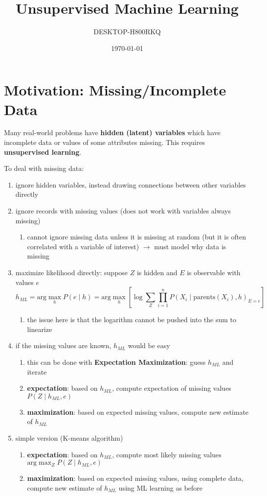 \documentclass[11pt]{article}
\author{DESKTOP-H800RKQ}
\date{\today}
\title{Unsupervised Machine Learning}
\begin{document}
\maketitle
\tableofcontents

\section{Motivation: Missing/Incomplete Data}
\label{sec:org3d6e7e9}
Many real-world problems have \textbf{hidden (latent) variables} which have incomplete data
or values of some attributes missing.
This requires \textbf{unsupervised learning}.

To deal with missing data:
\begin{enumerate}
\item ignore hidden variables, instead drawing connections between other variables directly
\item ignore records with missing values (does not work with variables always missing)
\begin{enumerate}
\item cannot ignore missing data unless it is missing at random (but it is often correlated
with a variable of interest) \(\to\) must model why data is missing
\end{enumerate}
\item maximize likelihood directly: suppose \(Z\) is hidden and \(E\) is observable with values \(e\)
$$ h_{ML} = \text{arg} \max_{h} P(e \mid h) = \text{arg} \max_{h} \left[ \log \sum_{Z} \prod_{i=1}^{n} P(X_{i} \mid \text{parents}(X_{i}), h)_{E = e} \right] $$
\begin{enumerate}
\item the issue here is that the logarithm cannot be pushed into the sum to linearize
\end{enumerate}
\item if the missing values are known, \(h_{ML}\) would be easy
\begin{enumerate}
\item this can be done with \textbf{Expectation Maximization}: guess \(h_{ML}\) and iterate
\item \textbf{expectation}: based on \(h_{ML}\), compute expectation of missing values \(P(Z \mid h_{ML}, e)\)
\item \textbf{maximization}: based on expected missing values, compute new estimate of \(h_{ML}\)
\end{enumerate}
\item simple version (K-means algorithm)
\begin{enumerate}
\item \textbf{expectation}: based on \(h_{ML}\), compute most likely missing values
\(\text{arg} \max_{Z} P(Z \mid h_{ML}, e)\)
\item \textbf{maximization}: based on expected missing values, using complete data, compute new
estimate of \(h_{ML}\) using ML learning as before
\end{enumerate}
\end{enumerate}
\end{document}
